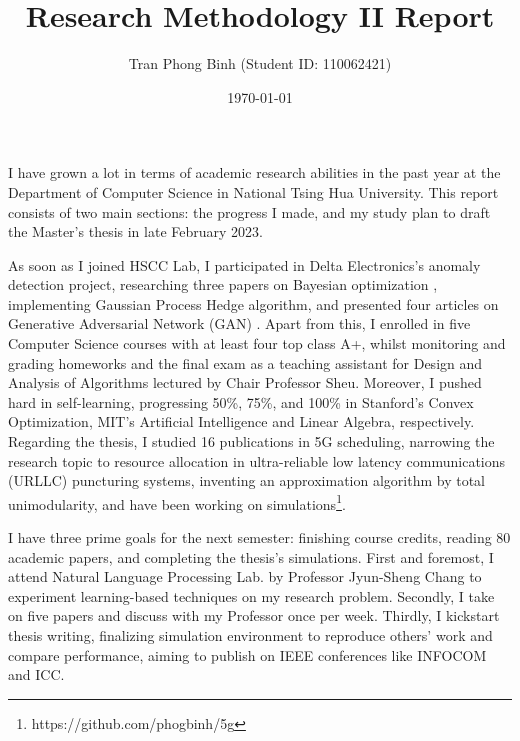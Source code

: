\documentclass[12pt, a4paper]{article}
\title{\textbf{Research Methodology II Report}}
\author{Tran Phong Binh (Student ID: 110062421)}
\affil{Advisor: Chair Professor Jang-Ping Sheu}
\date{\today}
\begin{document}
\maketitle

I have grown a lot in terms of academic research abilities in the past year at the Department of Computer Science in National Tsing Hua University. This report consists of two main sections: the progress I made, and my study plan to draft the Master's thesis in late February 2023.

As soon as I joined HSCC Lab, I participated in Delta Electronics's anomaly detection project, researching three papers on Bayesian optimization \cite{BHF10, HRGNTV19, SKKS12}, implementing Gaussian Process Hedge algorithm, and presented four articles on Generative Adversarial Network (GAN) \cite{HN21, LSLTKW21, QXX19, XDZ19}. Apart from this, I enrolled in five Computer Science courses with at least four top class A+, whilst monitoring and grading homeworks and the final exam as a teaching assistant for Design and Analysis of Algorithms lectured by Chair Professor Sheu. Moreover, I pushed hard in self-learning, progressing 50\%, 75\%, and 100\% in Stanford's Convex Optimization, MIT's Artificial Intelligence and Linear Algebra, respectively. Regarding the thesis, I studied 16 publications in 5G scheduling, narrowing the research topic to resource allocation in ultra-reliable low latency communications (URLLC) puncturing systems, inventing an approximation algorithm by total unimodularity, and have been working on simulations\footnote{https://github.com/phogbinh/5g}.

I have three prime goals for the next semester: finishing course credits, reading 80 academic papers, and completing the thesis's simulations. First and foremost, I attend Natural Language Processing Lab. by Professor Jyun-Sheng Chang to experiment learning-based techniques on my research problem. Secondly, I take on five papers and discuss with my Professor once per week. Thirdly, I kickstart thesis writing, finalizing simulation environment to reproduce others' work and compare performance, aiming to publish on IEEE conferences like INFOCOM and ICC.

\printbibliography
\end{document}
